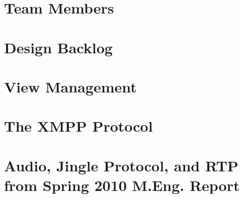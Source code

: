 \appendix

\section{Team Members}


\section{Design Backlog}


\section{View Management}


\section{The XMPP Protocol}


\section{Audio, Jingle Protocol, and RTP from Spring 2010 M.Eng. Report}
